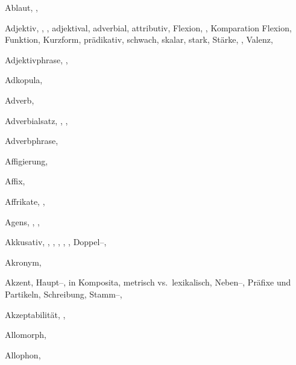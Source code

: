 \begin{theindex}

  \item Ablaut, , 
  \item Adjektiv, , , 
    \subitem adjektival, 
    \subitem adverbial, 
    \subitem attributiv, 
    \subitem Flexion, , 
    \subitem Komparation
      \subsubitem Flexion, 
      \subsubitem Funktion, 
    \subitem Kurzform, 
    \subitem prädikativ, 
    \subitem schwach, 
    \subitem skalar, 
    \subitem stark, 
    \subitem Stärke, , 
    \subitem Valenz, 
  \item Adjektivphrase, , 
  \item Adkopula, 
  \item Adverb, 
  \item Adverbialsatz, , , 
  \item Adverbphrase, 
  \item Affigierung, 
  \item Affix, 
  \item Affrikate, , 
  \item Agens, , , 
  \item Akkusativ, , , , 
		, , 
    \subitem Doppel--, 
  \item Akronym, 
  \item Akzent, 
    \subitem Haupt--, 
    \subitem in Komposita, 
    \subitem metrisch vs.\ lexikalisch, 
    \subitem Neben--, 
    \subitem Präfixe und Partikeln, 
\enlargethispage{\baselineskip}
    \subitem Schreibung, 
    \subitem Stamm--, 
  \item Akzeptabilität, , 
  \item Allomorph, 
  \item Allophon, 

\end{theindex}
